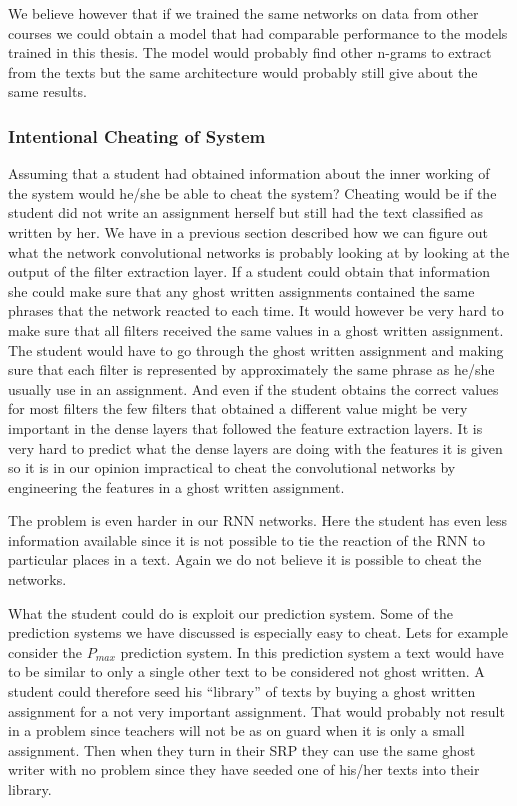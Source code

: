 We believe however that if we trained the same networks on data from other
courses we could obtain a model that had comparable performance to the models
trained in this thesis. The model would probably find other n-grams to extract
from the texts but the same architecture would probably still give about the
same results.


\subsubsection{Intentional Cheating of System}

Assuming that a student had obtained information about the inner working of
the system would he/she be able to cheat the system? Cheating would be if the
student did not write an assignment herself but still had the text classified
as written by her. We have in a previous section described how we can figure
out what the network convolutional networks is probably looking at by looking
at the output of the filter extraction layer. If a student could obtain that
information she could make sure that any ghost written assignments contained
the same phrases that the network reacted to each time. It would however be
very hard to make sure that all filters received the same values in a ghost
written assignment. The student would have to go through the ghost written
assignment and making sure that each filter is represented by approximately the
same phrase as he/she usually use in an assignment. And even if the student
obtains the correct values for most filters the few filters that obtained a
different value might be very important in the dense layers that followed the
feature extraction layers. It is very hard to predict what the dense layers
are doing with the features it is given so it is in our opinion impractical to
cheat the convolutional networks by engineering the features in a ghost written
assignment.

The problem is even harder in our \gls{RNN} networks. Here the student has even
less information available since it is not possible to tie the reaction of the
\gls{RNN} to particular places in a text. Again we do not believe it is possible
to cheat the networks.

What the student could do is exploit our prediction system. Some of the
prediction systems we have discussed is especially easy to cheat. Lets for
example consider the $P_{max}$ prediction system. In this prediction system a
text would have to be similar to only a single other text to be considered not
ghost written. A student could therefore seed his ``library'' of texts by buying
a ghost written assignment for a not very important assignment. That would
probably not result in a problem since teachers will not be as on guard when
it is only a small assignment. Then when they turn in their \gls{SRP} they can
use the same ghost writer with no problem since they have seeded one of his/her
texts into their library.


